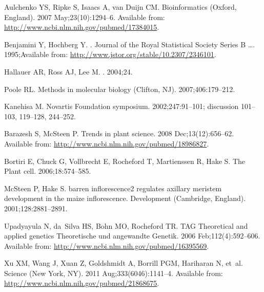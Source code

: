 \documentclass[10pt,letterpaper]{article}
\begin{document}
\begin{thebibliography}{10}
Aulchenko YS, Ripke S, Isaacs A, van Duijn CM.
\newblock Bioinformatics (Oxford, England). 2007 May;23(10):1294--6.
\newblock Available from: \url{http://www.ncbi.nlm.nih.gov/pubmed/17384015}.

Benjamini Y, Hochberg Y.
.
\newblock Journal of the Royal Statistical Society Series B \ldots.
  1995;Available from: \url{http://www.jstor.org/stable/10.2307/2346101}.

Hallauer AR, Ross AJ, Lee M.
. 2004;24.

Poole RL.
\newblock Methods in molecular biology (Clifton, NJ). 2007;406:179--212.

Kanehisa M.
\newblock Novartis Foundation symposium. 2002;247:91--101; discussion 101--103,
  119--128, 244--252.

Barazesh S, McSteen P.
\newblock Trends in plant science. 2008 Dec;13(12):656--62.
\newblock Available from: \url{http://www.ncbi.nlm.nih.gov/pubmed/18986827}.

Bortiri E, Chuck G, Vollbrecht E, Rocheford T, Martienssen R, Hake S.
\newblock The Plant cell. 2006;18:574--585.

McSteen P, Hake S.
\newblock barren inflorescence2 regulates axillary meristem development in the
  maize inflorescence.
\newblock Development (Cambridge, England). 2001;128:2881--2891.

Upadyayula N, da~Silva HS, Bohn MO, Rocheford TR.
\newblock TAG Theoretical and applied genetics Theoretische und angewandte
  Genetik. 2006 Feb;112(4):592--606.
\newblock Available from: \url{http://www.ncbi.nlm.nih.gov/pubmed/16395569}.

Xu XM, Wang J, Xuan Z, Goldshmidt A, Borrill PGM, Hariharan N, et~al.
\newblock Science (New York, NY). 2011 Aug;333(6046):1141--4.
\newblock Available from: \url{http://www.ncbi.nlm.nih.gov/pubmed/21868675}.


\end{thebibliography}
\end{document}
